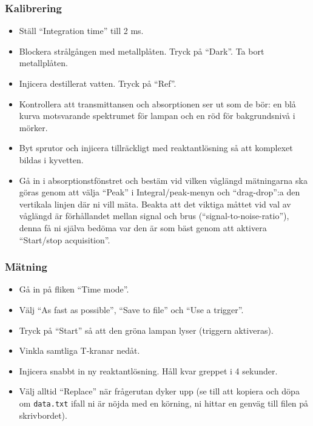 \subsubsection{Kalibrering}
\begin{itemize}
\item Ställ ``Integration time'' till 2 ms.
\item Blockera strålgången med metallplåten. Tryck på ``Dark''. Ta bort
  metallplåten.
\item Injicera destillerat vatten. Tryck på ``Ref''.
\item Kontrollera att transmittansen och absorptionen ser ut som de
  bör: en blå kurva motsvarande spektrumet för lampan och en röd för
  bakgrundsnivå i mörker.
\item Byt sprutor och injicera tillräckligt med reaktantlösning så att
  komplexet bildas i kyvetten.
\item Gå in i absorptionstfönstret och bestäm vid vilken våglängd
  mätningarna ska göras genom att välja ``Peak'' i Integral/peak-menyn
  och ``drag-drop'':a den vertikala linjen där ni vill mäta. Beakta att det
  viktiga måttet vid val av våglängd är förhållandet mellan signal och brus
  (``signal-to-noise-ratio''), denna få ni själva bedöma var den är som
  bäst genom att aktivera ``Start/stop acquisition''.
\end{itemize}
\subsubsection{Mätning}
\begin{itemize}
\item Gå in på fliken ``Time mode''.
\item Välj ``As fast as possible'', ``Save to file'' och ``Use a trigger''.
\item Tryck på ``Start'' så att den gröna lampan lyser (triggern aktiveras).
\item Vinkla samtliga T-kranar nedåt.
\item Injicera snabbt in ny reaktantlösning. Håll kvar greppet i 4 sekunder.
\item Välj alltid ``Replace'' när frågerutan dyker upp (se till att
  kopiera och döpa om {\tt data.txt} ifall ni är nöjda med en körning, ni
  hittar en genväg till filen på skrivbordet).
\end{itemize}

